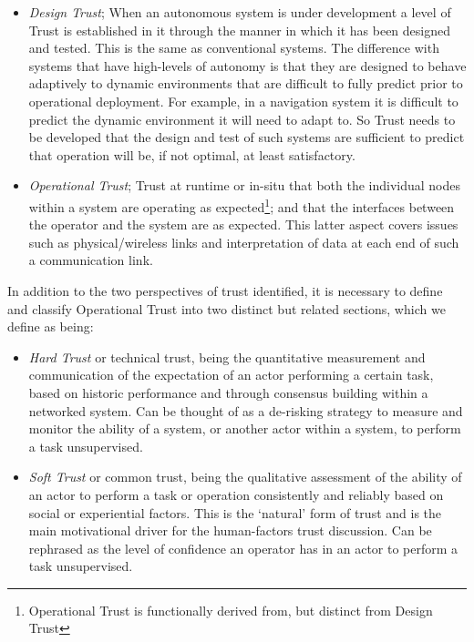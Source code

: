 \documentclass[runningheads,a4paper]{llncs}
\begin{document}
\begin{itemize}
  \item \emph{Design Trust}; When an autonomous system is under development a level of Trust is established in it through the manner in which it has been designed and tested.
    This is the same as conventional systems.
    The difference with systems that have high-levels of autonomy is that they are designed to behave adaptively to dynamic environments that are difficult to fully predict prior to operational deployment.
    For example, in a navigation system it is difficult to predict the dynamic environment it will need to adapt to.
    So Trust needs to be developed that the design and test of such systems are sufficient to predict that operation will be, if not optimal, at least satisfactory.

  \item \emph{Operational Trust}; Trust at runtime or in-situ that both the individual nodes within a system are operating as expected\footnote{Operational Trust is functionally derived from, but distinct from Design Trust}; and that the interfaces between the operator and the system are as expected.
    This latter aspect covers issues such as physical/wireless links and interpretation of data at each end of such a communication link.
\end{itemize}

In addition to the two perspectives of trust identified, it is necessary to define and classify Operational Trust into two distinct but related sections, which we define as being:
\begin{itemize}
  \item \emph{Hard Trust} or technical trust, being the quantitative measurement and communication of the expectation of an actor performing a certain task, based on historic performance and through consensus building within a networked system.
    Can be thought of as a de-risking strategy to measure and monitor the ability of a system, or another actor within a system, to perform a task unsupervised.
  \item \emph{Soft Trust} or common trust, being the qualitative assessment of the ability of an actor to perform a task or operation consistently and reliably based on social or experiential factors.
    This is the ‘natural’ form of trust and is the main motivational driver for the human-factors trust discussion.
    Can be rephrased as the level of confidence an operator has in an actor to perform a task unsupervised.
\end{itemize} 
\end{document}
